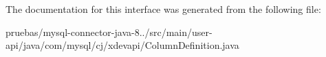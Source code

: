 The documentation for this interface was generated from the following file\+:\begin{DoxyCompactItemize}
\item 
pruebas/mysql-\/connector-\/java-\/8../src/main/user-\/api/java/com/mysql/cj/xdevapi/Column\+Definition.\+java\end{DoxyCompactItemize}

